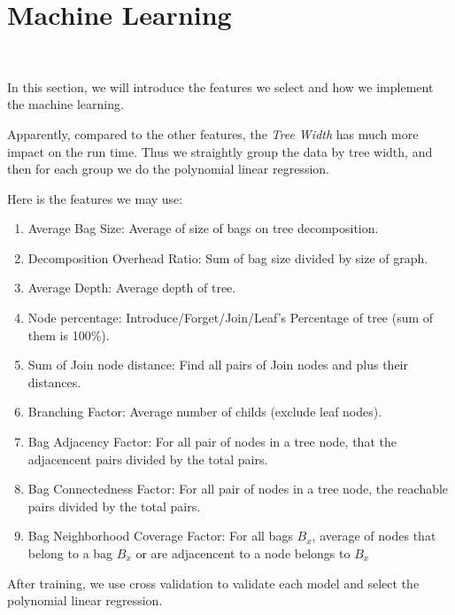 \section{Machine Learning}~\label{sec.ML}

In this section, we will introduce the features we select and how we implement the machine learning.

Apparently, compared to the other features, the \textit{Tree Width} has much more impact on the run time. Thus we straightly group the data by tree width, and then for each group we do the polynomial linear regression.

Here is the features we may use:

\begin{enumerate}
    \item Average Bag Size: Average of size of bags on tree decomposition.
    \item Decomposition Overhead Ratio: Sum of bag size divided by size of graph.
    \item Average Depth: Average depth of tree.
    \item Node percentage: Introduce/Forget/Join/Leaf's Percentage of tree (sum of them is 100\%).
    \item Sum of Join node distance: Find all pairs of Join nodes and plus their distances.
    \item Branching Factor: Average number of childs (exclude leaf nodes).
    \item Bag Adjacency Factor: For all pair of nodes in a tree node, that the adjacencent pairs divided by the total pairs.
    \item Bag Connectedness Factor: For all pair of nodes in a tree node, the reachable pairs divided by the total pairs.
    \item Bag Neighborhood Coverage Factor: For all bags $B_{x}$, average of nodes that belong to a bag $B_{x}$ or are adjacencent to a node belongs to $B_{x}$
\end{enumerate}

After training, we use cross validation to validate each model and select the polynomial linear regression.